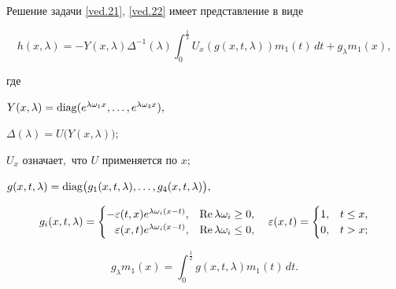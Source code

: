\smallskip

\begin{lemma}[2]Решение задачи {\rm \eqref{ved.21}, \eqref{ved.22}} имеет представление в виде

\begin{equation}

\label{ved.23}

h(x,\lambda)=-Y(x,\lambda)\Delta^{-1}(\lambda)\int^{\frac{1}{2}}_{0}U_x(g(x,t,\lambda))m_1(t)\,dt+g_{\lambda}m_1(x),

\end{equation}

где

$

Y(x,\lambda)=\mathop{\rm diag} (e^{\lambda \omega_1x},\ldots, e^{\lambda \omega_4x}),$

 $\Delta(\lambda)=U\bigl(Y(x,\lambda)\bigr);$ 

$U_x$ означает$,$ что $U$ применяется по $x;$

 $

g(x,t,\lambda)=\mathop{\rm diag}\bigl(g_1(x,t,\lambda),\ldots, g_{4}(x,t,\lambda)\bigr),

$

$$

    g_{i}(x,t,\lambda) = 

\begin{cases}

-  \varepsilon (t,x) e^{\lambda \omega_i (x-t)}, & \mathop{\rm Re} \lambda\omega _i \geq 0, \\

\phantom{-} \varepsilon (x,t) e^{\lambda \omega_i (x-t)},&   \mathop{\rm Re} \lambda\omega _i \leq 0,

\end{cases}

\quad 

\varepsilon (x,t) = 

\begin{cases}

    1, & t \leq x, \\

    0, &  t > x; \end{cases}

$$

$$

g_{\lambda}m_1(x)=\int^{\frac{1}{2}}_{0}g(x,t,\lambda)m_1(t)\,dt.

$$

\end{lemma}

